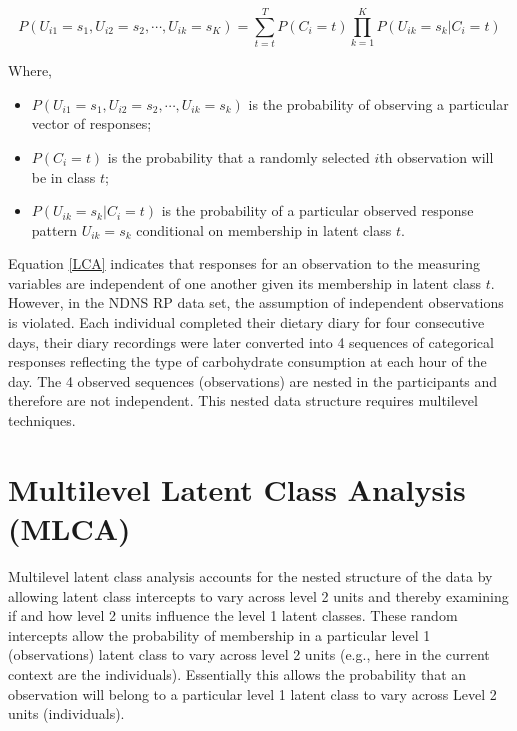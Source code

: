 \begin{equation}
P(U_{i1} = s_1, U_{i2} = s_2, \cdots, U_{ik} = s_K) = \sum_{t=t}^{T}P(C_i = t)\prod_{k = 1}^{K}P(U_{ik} = s_k | C_i = t)
\label{LCA}
\end{equation}\vspace{-0.7cm}

Where, 

\begin{itemize}
	\item $P(U_{i1} = s_1, U_{i2} = s_2, \cdots, U_{ik} = s_k)$ is the probability of observing a particular vector of responses;
	\item $P(C_i = t)$ is the probability that a randomly selected $i$th observation will be in class $t$;
	\item $P(U_{ik} = s_k | C_i = t)$ is the probability of a particular observed response pattern $U_{ik} = s_k$ conditional on membership in latent class $t$.
\end{itemize}


Equation \ref{LCA} indicates that responses for an observation to the measuring variables are independent of one another given its membership in latent class $t$. However, in the NDNS RP data set, the assumption of independent observations is violated. Each individual completed their dietary diary for four consecutive days, their diary recordings were later converted into 4 sequences of categorical responses reflecting the type of carbohydrate consumption at each hour of the day. The 4 observed sequences (observations) are nested in the participants and therefore are not independent. This nested data structure requires multilevel techniques. 
\vspace{-0.3cm}


\section{Multilevel Latent Class Analysis (MLCA)}\vspace{-0.3cm}


Multilevel latent class analysis accounts for the nested structure of the data by allowing latent class intercepts to vary across level 2 units and thereby examining if and how level 2 units influence the level 1 latent classes. These random intercepts allow the probability of
membership in a particular level 1 (observations) latent class to vary across level 2 units (e.g., here in the current context are the individuals). Essentially this allows the probability that an observation will belong to a
particular level 1 latent class to vary across Level 2 units (individuals). \vspace{-0.5cm}

